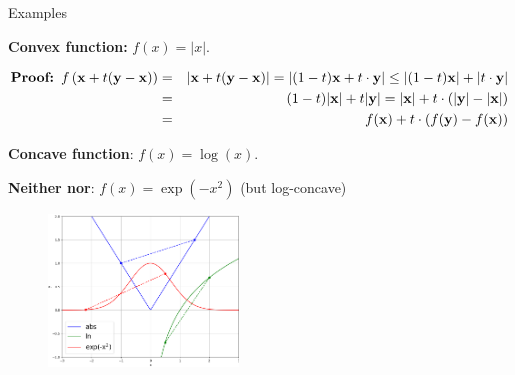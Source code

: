 \begin{vbframe}{Examples}

\textbf{Convex function:} $f(x) = |x|$. \\
\begin{footnotesize}

\vspace*{-0.5cm}

\begin{eqnarray*}
\textbf{Proof: } f\left(\mathbf{x} + t(\mathbf{y} - \mathbf{x})\right) &=& |\mathbf{x} + t(\mathbf{y} - \mathbf{x})| = |(1 - t) \mathbf{x} + t\cdot\mathbf{y}| \le |(1 - t) \mathbf{x}| + |t\cdot\mathbf{y}| \\ &=& (1 - t) |\mathbf{x}| + t |\mathbf{y}| = |\mathbf{x}| + t \cdot (|\mathbf{y}| - |\mathbf{x}|) \\ &=& f(\mathbf{x}) + t \cdot (f(\mathbf{y}) - f(\mathbf{x}))
\end{eqnarray*}
\end{footnotesize}

\textbf{Concave function}: $f(x) = \log(x)$. 

\vspace*{0.2cm}

\textbf{Neither nor}: $f(x) = \exp(-x^2)$ (but log-concave)

\begin{figure}
    \centering
    \includegraphics[width=0.45\textwidth]{figure_man/conv_conc_functions.png}
\end{figure}

\end{vbframe}




